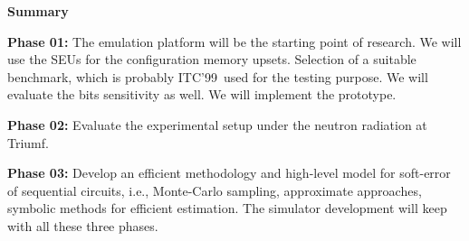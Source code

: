 \textbf{Summary}

\textbf{Phase  01:} The emulation platform will be the starting point of research. We will use the SEUs for the configuration memory upsets. Selection of a suitable benchmark, which is probably ITC'99~\cite{ITC}used for the testing purpose. We will evaluate the bits sensitivity as well. We will implement the prototype. 

\textbf{Phase  02:} Evaluate the experimental setup under the neutron radiation at Triumf.


\textbf{Phase 03:} Develop an efficient methodology and high-level model for soft-error of sequential circuits, i.e., Monte-Carlo sampling, approximate approaches, symbolic methods for efficient estimation. The simulator development will keep with all these three phases.



